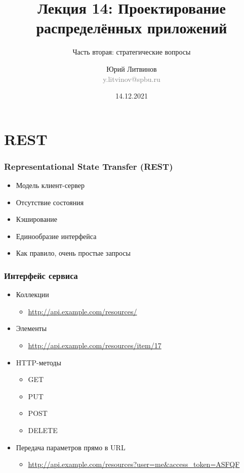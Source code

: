 \documentclass[xetex,mathserif,serif]{beamer}
\title{Лекция 14: Проектирование распределённых приложений}
\subtitle{Часть вторая: стратегические вопросы}
\author[Юрий Литвинов]{Юрий Литвинов\\\small{\textcolor{gray}{y.litvinov@spbu.ru}}}
\date{14.12.2021}
\begin{document}
    \frame{\titlepage}

    \section{REST}

    \begin{frame}
        \frametitle{Representational State Transfer (REST)}
        \begin{itemize}
            \item Модель клиент-сервер
            \item Отсутствие состояния
            \item Кэширование
            \item Единообразие интерфейса
            \item Как правило, очень простые запросы
        \end{itemize}
    \end{frame}

    \begin{frame}
        \frametitle{Интерфейс сервиса}
        \begin{itemize}
            \item Коллекции
            \begin{itemize}
                \item \url{http://api.example.com/resources/}
            \end{itemize}
            \item Элементы
            \begin{itemize}
                \item \url{http://api.example.com/resources/item/17}
            \end{itemize}
            \item HTTP-методы
            \begin{itemize}
                \item GET
                \item PUT
                \item POST
                \item DELETE
            \end{itemize}
            \item Передача параметров прямо в URL
            \begin{itemize}
                \item \url{http://api.example.com/resources?user=me&access_token=ASFQF}
            \end{itemize}
        \end{itemize}
    \end{frame}
\end{document}
